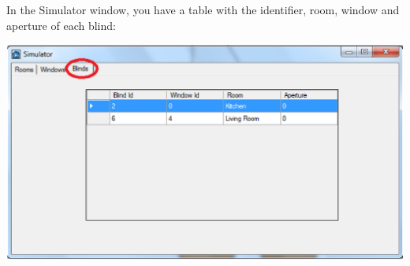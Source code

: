 In the Simulator window, you have a table with the identifier, room, window and aperture of each blind:
\begin{center}
	\includegraphics[width=.75\linewidth]{images/simulatorBlind.eps}
	\\
\vspace{1cm}
\end{center}